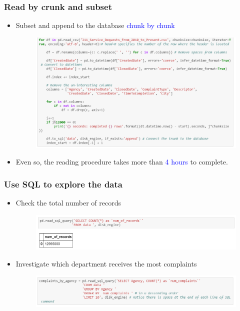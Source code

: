 \documentclass[red]{beamer}
\begin{document}
\begin{frame}
\frametitle{Read by crunk and subset}
\begin{itemize}
	
	\item Subset and append to the database \textcolor{blue}{chunk by chunk}
	\begin{figure}
		\centering
		\includegraphics[width=1\linewidth]{figure/screenshot004}
	\end{figure}
	\item Even so, the reading procedure takes more than \textcolor{blue}{4 hours} to complete.
\end{itemize}
\end{frame}

\begin{frame}
\frametitle{Use SQL to explore the data}
\begin{itemize}
	\item Check the total number of records
	\begin{figure}
		\centering
		\includegraphics[width=1\linewidth]{figure/screenshot005}
	\end{figure}
\vspace{2mm}
	\item Investigate which department receives the most complaints
	\begin{figure}
		\centering
		\includegraphics[width=1\linewidth]{figure/screenshot006}
	\end{figure}	
\end{itemize}
\end{frame}
\end{document}
